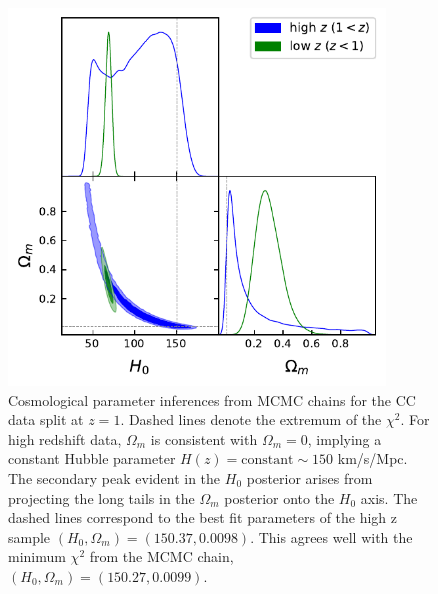 \documentclass[aps,prl,10pt,twocolumn,superscriptaddress, nofootinbib]{revtex4}
\begin{document}
\begin{figure}[htb]
   \centering
\includegraphics[width=100mm]{pressureless_matter/CC_zsplit1.pdf}
\caption{Cosmological parameter inferences from MCMC chains for the CC data split at $z=1$. Dashed lines denote the extremum of the $\chi^2$. For high redshift data, $\Omega_m$ is consistent with $\Omega_m = 0$, implying a constant Hubble parameter $H(z)=\textrm{constant} \sim 150$ km/s/Mpc. The secondary peak evident in the $H_0$ posterior arises from projecting the long tails in the $\Omega_m$ posterior onto the $H_0$ axis. The dashed lines correspond to the best fit parameters of the high z sample $(H_0, \Omega_m) = (150.37, 0.0098)$. This agrees well with the minimum $\chi^2$ from the MCMC chain, $(H_0, \Omega_m) = (150.27,0.0099)$.}
\label{fig:CCsplit1} 
\end{figure}
\end{document}
